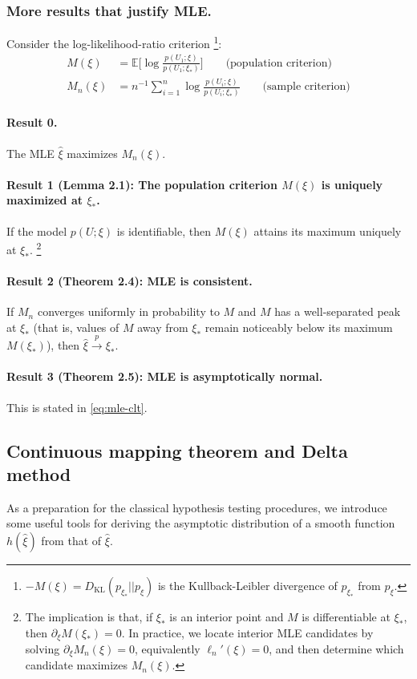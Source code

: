 \documentclass{article}
\theoremstyle{break}
\newcommand{\E}{\ensuremath{\mathbb{E}}}
\begin{document}
\subsubsection{More results that justify MLE.}
Consider the log-likelihood-ratio criterion
\footnote{$-M(\xi) = D_\mathrm{KL}(p_{\xi_*} || p_\xi)$ is the Kullback-Leibler divergence of $p_{\xi_*}$ from $p_\xi$.}:
\begin{align*}
    M(\xi) &= \E\Big[\log \frac{p(U_1; \xi)}{p(U_1; \xi_*)}\Big] \qquad \text{(population criterion)}\\
    M_n(\xi) &= n^{-1} \sum_{i=1}^n \log \frac{p(U_i; \xi)}{p(U_i; \xi_*)} \qquad \text{(sample criterion)}
\end{align*}

\paragraph{Result 0.} The MLE $\hat\xi$ maximizes $M_n(\xi)$.

\paragraph{Result 1 (Lemma 2.1): The population criterion $M(\xi)$ is uniquely maximized at $\xi_*$.}
If the model $p(U;\xi)$ is identifiable, then $M(\xi)$ attains its maximum uniquely at $\xi_*$.
\footnote{The implication is that, if $\xi_*$ is an interior point and $M$ is differentiable at $\xi_*$, then $\partial_\xi M(\xi_*)=0$. In practice, we locate interior MLE candidates by solving $\partial_\xi M_n(\xi)=0$, equivalently $\ell_n'(\xi)=0$, and then determine which candidate maximizes $M_n(\xi)$.}

\paragraph{Result 2 (Theorem 2.4): MLE is consistent.} If $M_n$ converges uniformly in probability to $M$ and $M$ has a well-separated peak at $\xi_*$ (that is, values of $M$ away from $\xi_*$ remain noticeably below its maximum $M(\xi_*)$), then $\hat\xi \stackrel{p}{\to} \xi_*$.

\paragraph{Result 3 (Theorem 2.5): MLE is asymptotically normal.} This is stated in \eqref{eq:mle-clt}.

\subsection{Continuous mapping theorem and Delta method}\label{sec:prelim-glm-cmt-delta}
As a preparation for the classical hypothesis testing procedures, we introduce some useful tools for deriving the asymptotic distribution of a smooth function $h(\hat{\xi})$ from that of $\hat\xi$.
\end{document}
